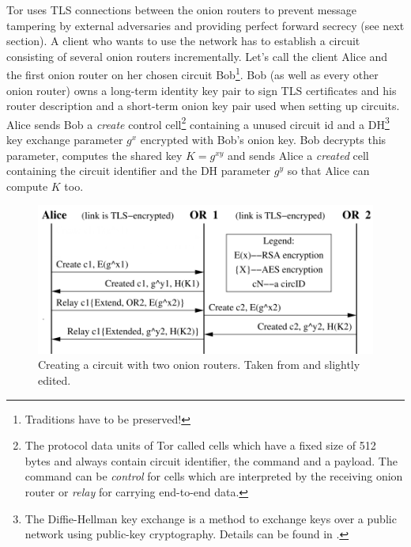 Tor uses TLS connections between the onion routers to prevent message tampering by external adversaries and providing perfect forward secrecy (see next section). A client who wants to use the network has to establish a circuit consisting of several onion routers incrementally. Let's call the client Alice and the first onion router on her chosen circuit Bob\footnote{
	Traditions have to be preserved!
}. Bob (as well as every other onion router) owns a long-term identity key pair to sign TLS certificates and his router description and a short-term onion key pair used when setting up circuits. \\ Alice sends Bob a \textit{create} control cell\footnote{The protocol data units of Tor called cells which have a fixed size of 512 bytes and always contain circuit identifier, the command and a payload. The command can be \textit{control} for cells which are interpreted by the receiving onion router or \textit{relay} for carrying end-to-end data.
} containing a unused circuit id and a DH\footnote{
	The Diffie-Hellman key exchange is a method to exchange keys over a public network using public-key cryptography. Details can be found in \cite{diffie1976new}.
} key exchange parameter \(g^x\) encrypted with Bob's onion key. Bob decrypts this parameter, computes the shared key \(K = g^{xy}\) and sends Alice a \textit{created} cell containing the circuit identifier and the DH parameter \(g^y\) so that Alice can compute \(K\) too.

\begin{figure}
	\includegraphics[width=\columnwidth]{img/circuit_creation.png}
	\caption{Creating a circuit with two onion routers. Taken from \cite{tor2004original} and slightly edited.}
	\label{img_circuit_creation}
\end{figure}

